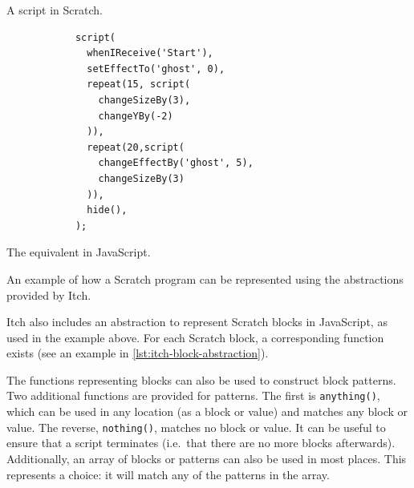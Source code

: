 \documentclass[../main]{subfiles}
\begin{document}
\begin{listing}
    \begin{wide}
        \begin{sublisting}{0.49\linewidth}
            \begin{scratch}[scale=0.8]
                {
                }
                {
                }

            \end{scratch}
            \caption{A script in Scratch.}
        \end{sublisting}
        \begin{sublisting}{0.5\linewidth}
            \begin{verbatim}
            script(
              whenIReceive('Start'),
              setEffectTo('ghost', 0),
              repeat(15, script(
                changeSizeBy(3),
                changeYBy(-2)
              )),
              repeat(20,script(
                changeEffectBy('ghost', 5),
                changeSizeBy(3)
              )),
              hide(),
            );
            \end{verbatim}
            \caption{The equivalent in JavaScript.}
        \end{sublisting}
    \end{wide}
    \caption{An example of how a Scratch program can be represented using the abstractions provided by Itch.}\label{lst:itch-block-abstraction}
\end{listing}

Itch also includes an abstraction to represent Scratch blocks in JavaScript, as used in the example above.
For each Scratch block, a corresponding function exists (see an example in \cref{lst:itch-block-abstraction}).

The functions representing blocks can also be used to construct block patterns.
Two additional functions are provided for patterns.
The first is \texttt{anything()}, which can be used in any location (as a block or value) and matches any block or value.
The reverse, \texttt{nothing()}, matches no block or value.
It can be useful to ensure that a script terminates (i.e.\ that there are no more blocks afterwards).
Additionally, an array of blocks or patterns can also be used in most places.
This represents a choice: it will match any of the patterns in the array.
\end{document}
